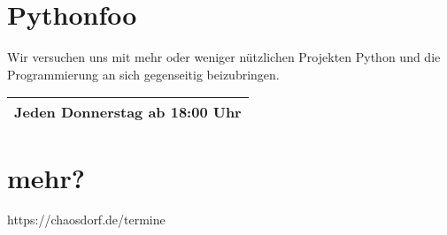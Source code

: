 \documentclass{article}
\begin{document}
    \section*{Pythonfoo}
    Wir versuchen uns mit mehr oder weniger nützlichen Projekten Python und
    die Programmierung an sich gegenseitig beizubringen.

    \begin{tabular}{ c }
        \\
        \hline
        Jeden Donnerstag ab 18:00 Uhr \\
        \hline
    \end{tabular}

    \section*{mehr?}
    https://chaosdorf.de/termine
\end{document}
